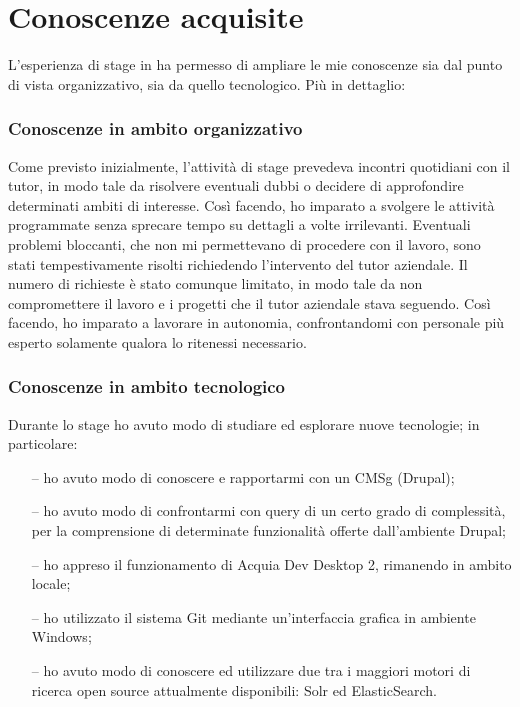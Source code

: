 \section{Conoscenze acquisite}
L'esperienza di stage in \nomeAzienda ha permesso di ampliare le mie conoscenze sia dal punto di vista organizzativo, sia da quello tecnologico. Più in dettaglio:

	\subsubsection{Conoscenze in ambito organizzativo}
	Come previsto inizialmente, l'attività di stage prevedeva incontri quotidiani con il tutor, in modo tale da risolvere eventuali dubbi o decidere di approfondire determinati ambiti di interesse. Così facendo, ho imparato a svolgere le attività programmate senza sprecare tempo su dettagli a volte irrilevanti. Eventuali problemi bloccanti, che non mi permettevano di procedere con il lavoro, sono stati tempestivamente risolti richiedendo l'intervento del tutor aziendale. Il numero di richieste è stato comunque limitato, in modo tale da non compromettere il lavoro e i progetti che il tutor aziendale stava seguendo. Così facendo, ho imparato a lavorare in autonomia, confrontandomi con personale più esperto solamente qualora lo ritenessi necessario.

	\subsubsection{Conoscenze in ambito tecnologico}
	Durante lo stage ho avuto modo di studiare ed esplorare nuove tecnologie; in particolare:
	\begin{itemize}
		\item[--] {ho avuto modo di conoscere e rapportarmi con un \gls{CMSg} (\gls{Drupal});}
		\item[--] {ho avuto modo di confrontarmi con query di un certo grado di complessità, per la comprensione di determinate funzionalità offerte dall'ambiente \gls{Drupal};}
		\item[--] {ho appreso il funzionamento di \gls{Acquia Dev Desktop 2}, rimanendo in ambito locale;}
		\item[--] {ho utilizzato il sistema \gls{Git} mediante un'interfaccia grafica in ambiente Windows;}
		\item[--] {ho avuto modo di conoscere ed utilizzare due tra i maggiori motori di ricerca \gls{open source} attualmente disponibili: \gls{Solr} ed \gls{ElasticSearch}.}
	\end{itemize}

